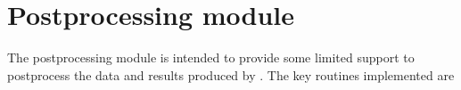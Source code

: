\documentclass[letterpaper,10pt,english]{sphinxmanual}
\begin{document}
\chapter{Postprocessing module}
\label{\detokenize{index:postprocessing-module}}
\sphinxAtStartPar
The postprocessing module is intended to provide some limited support to post\sphinxhyphen{}process
the data and results produced by . The key routines implemented are

\label{\detokenize{index:module-pyparsvd.postprocessing}}
\end{document}
